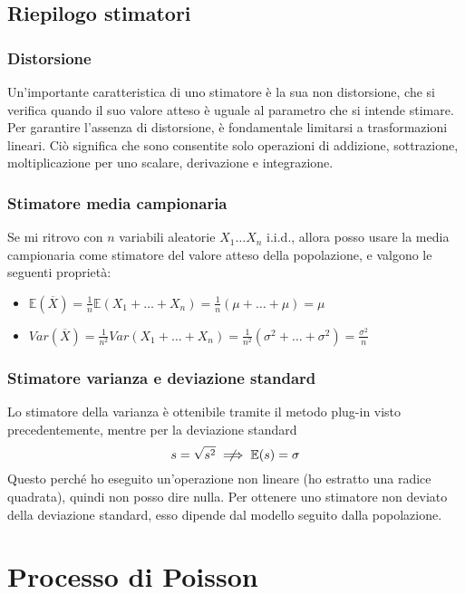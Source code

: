 \documentclass[11pt]{report}
\begin{document}
\section{Riepilogo stimatori}
\subsection{Distorsione}
Un'importante caratteristica di uno stimatore è la sua non distorsione, che si verifica quando il suo valore atteso è uguale al parametro che si intende stimare. Per garantire l'assenza di distorsione, è fondamentale limitarsi a trasformazioni lineari. Ciò significa che sono consentite solo operazioni di addizione, sottrazione, moltiplicazione per uno scalare, derivazione e integrazione.
\subsection{Stimatore media campionaria}
Se mi ritrovo con $n$ variabili aleatorie $X_1\dots X_n$ i.i.d., allora posso usare la media campionaria come stimatore del valore atteso della popolazione, e valgono le seguenti proprietà:
\begin{itemize}
    \item $\mathbb{E} \left( \overline{X} \right) = \frac{1}{n}\mathbb{E}\left( X_1+\dots+X_n \right) = \frac{1}{n} \left( \mu+\dots+\mu \right) = \mu$
    \item $Var(\overline{X}) = \frac{1}{n^2}Var(X_1 + \dots + X_n) = \frac{1}{n^2}(\sigma^2+\dots+\sigma^2) = \frac{\sigma^2}{n}$
\end{itemize}
\subsection{Stimatore varianza e deviazione standard}
Lo stimatore della varianza è ottenibile tramite il metodo plug-in visto precedentemente, mentre per la deviazione standard
\begin{equation}
	s = \sqrt{s^2} \centernot \implies \mathbb{E}(s) = \sigma
\end{equation}
Questo perché ho eseguito un'operazione non lineare (ho estratto una radice quadrata), quindi non posso dire nulla. Per ottenere uno stimatore non deviato della deviazione standard, esso dipende dal modello seguito dalla popolazione.

\chapter{Processo di Poisson}
\end{document}

